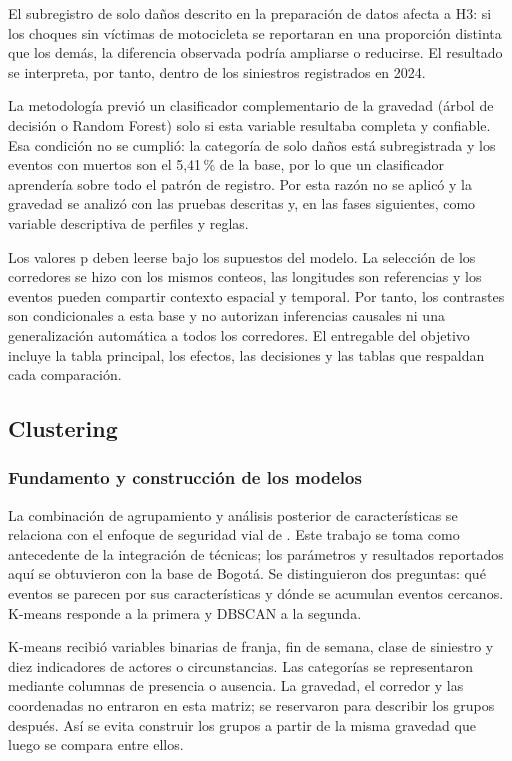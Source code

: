 \documentclass[12pt,letterpaper]{article}
\begin{document}
El subregistro de solo daños descrito en la preparación de datos afecta
a H3: si los choques sin víctimas de motocicleta se reportaran en una
proporción distinta que los demás, la diferencia observada podría
ampliarse o reducirse. El resultado se interpreta, por tanto, dentro de
los siniestros registrados en 2024.

La metodología previó un clasificador complementario de la gravedad
(árbol de decisión o Random Forest) solo si esta variable resultaba
completa y confiable. Esa condición no se cumplió: la categoría de solo
daños está subregistrada y los eventos con muertos son el 5,41\,\% de la
base, por lo que un clasificador aprendería sobre todo el patrón de
registro. Por esta razón no se aplicó y la gravedad se analizó con las
pruebas descritas y, en las fases siguientes, como variable descriptiva
de perfiles y reglas.

Los valores p deben leerse bajo los supuestos del modelo. La selección
de los corredores se hizo con los mismos conteos, las longitudes son
referencias y los eventos pueden compartir contexto espacial y temporal.
Por tanto, los contrastes son condicionales a esta base y no autorizan
inferencias causales ni una generalización automática a todos los
corredores. El entregable del objetivo incluye la tabla principal,
los efectos, las decisiones y las tablas que respaldan cada comparación.

\subsection{Clustering}

\subsubsection{Fundamento y construcción de los modelos}

La combinación de agrupamiento y análisis posterior de características
se relaciona con el enfoque de seguridad vial de
\citet{sathiyanathan2024}. Este trabajo se toma como antecedente de la
integración de técnicas; los parámetros y resultados reportados aquí
se obtuvieron con la base de Bogotá.
Se distinguieron dos preguntas: qué eventos se parecen por sus
características y dónde se acumulan eventos cercanos. K-means responde
a la primera y DBSCAN a la segunda.

K-means recibió variables binarias de franja, fin de semana, clase de
siniestro y diez indicadores de actores o circunstancias. Las categorías
se representaron mediante columnas de presencia o ausencia. La gravedad,
el corredor y las coordenadas no entraron en esta matriz; se reservaron
para describir los grupos después. Así se evita construir los grupos a
partir de la misma gravedad que luego se compara entre ellos.
\end{document}
